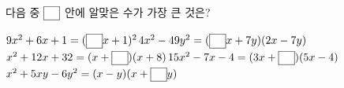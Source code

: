 다음 중 $\blank$ 안에 알맞은 수가 가장 큰 것은?
\begin{choicesv}{$9x^2+6x+1=(\blank x+1)^2$}{$4x^2-49y^2=(\blank x+7y)(2x-7y)$}{$x^2+12x+32=(x+\blank)(x+8)$}{$15x^2-7x-4=(3x+\blank)(5x-4)$}{$x^2+5xy-6y^2=(x-y)(x+\blank y)$}\end{choicesv}
